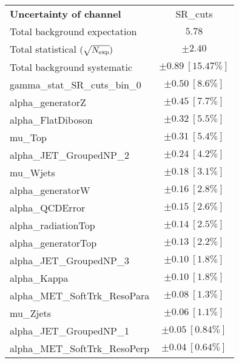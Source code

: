 
\begin{table}
\begin{center}
\setlength{\tabcolsep}{0.0pc}
\begin{tabular*}{\textwidth}{@{\extracolsep{\fill}}lc}
\noalign{\smallskip}\hline\noalign{\smallskip}
{\bf Uncertainty of channel}                                    & SR\_cuts            \\
\noalign{\smallskip}\hline\noalign{\smallskip}
Total background expectation             &  $5.78$       \\
\noalign{\smallskip}\hline\noalign{\smallskip}
Total statistical $(\sqrt{N_{\rm exp}})$              & $\pm 2.40$       \\
Total background systematic               & $\pm 0.89\ [15.47\%] $             \\
\noalign{\smallskip}\hline\noalign{\smallskip}
\noalign{\smallskip}\hline\noalign{\smallskip}
gamma\_stat\_SR\_cuts\_bin\_0         & $\pm 0.50\ [8.6\%] $       \\
alpha\_generatorZ         & $\pm 0.45\ [7.7\%] $       \\
alpha\_FlatDiboson         & $\pm 0.32\ [5.5\%] $       \\
mu\_Top         & $\pm 0.31\ [5.4\%] $       \\
alpha\_JET\_GroupedNP\_2         & $\pm 0.24\ [4.2\%] $       \\
mu\_Wjets         & $\pm 0.18\ [3.1\%] $       \\
alpha\_generatorW         & $\pm 0.16\ [2.8\%] $       \\
alpha\_QCDError         & $\pm 0.15\ [2.6\%] $       \\
alpha\_radiationTop         & $\pm 0.14\ [2.5\%] $       \\
alpha\_generatorTop         & $\pm 0.13\ [2.2\%] $       \\
alpha\_JET\_GroupedNP\_3         & $\pm 0.10\ [1.8\%] $       \\
alpha\_Kappa         & $\pm 0.10\ [1.8\%] $       \\
alpha\_MET\_SoftTrk\_ResoPara         & $\pm 0.08\ [1.3\%] $       \\
mu\_Zjets         & $\pm 0.06\ [1.1\%] $       \\
alpha\_JET\_GroupedNP\_1         & $\pm 0.05\ [0.84\%] $       \\
alpha\_MET\_SoftTrk\_ResoPerp         & $\pm 0.04\ [0.64\%] $       \\

\end{tabular*}
\end{center}
\end{table}
